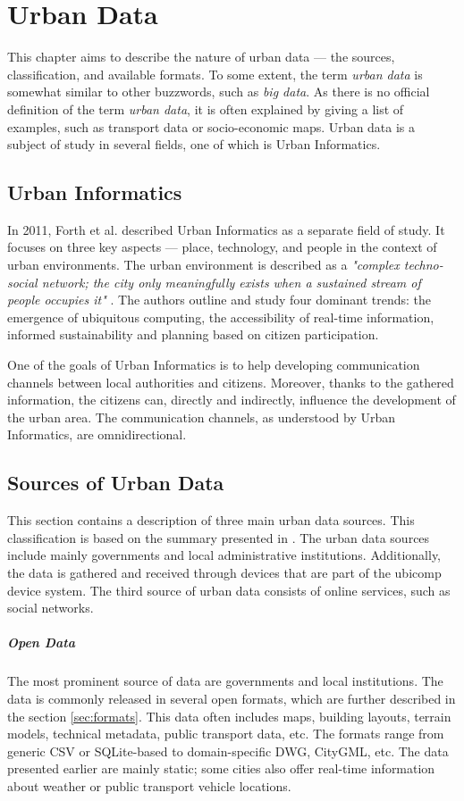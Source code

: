 \chapter{Urban Data}
This chapter aims to describe the nature of urban data --- the sources, classification, and available formats. To some extent, the term \textit{urban data} is somewhat similar to other buzzwords, such as \textit{big data}. As there is no official definition of the term \textit{urban data}, it is often explained by giving a list of examples, such as transport data or socio-economic maps. Urban data is a subject of study in several fields, one of which is Urban Informatics.

\section{Urban Informatics}
In 2011, Forth et al. \cite{foth2011urban} described Urban Informatics as a separate field of study. It focuses on three key aspects --- place, technology, and people in the context of urban environments. The urban environment is described as a \textit{"complex techno-social network; the city only meaningfully exists when a sustained stream of people occupies it"} \cite{foth2011urban}. The authors outline and study four dominant trends: the emergence of ubiquitous computing, the accessibility of real-time information, informed sustainability and planning based on citizen participation. 

One of the goals of Urban Informatics is to help developing communication channels between local authorities and citizens. Moreover, thanks to the gathered information, the citizens can, directly and indirectly, influence the development of the urban area. The communication channels, as understood by Urban Informatics, are omnidirectional. 

\section{Sources of Urban Data}
This section contains a description of three main urban data sources. This classification is based on the summary presented in \cite{robinson2012street}. The urban data sources include mainly governments and local administrative institutions. Additionally, the data is gathered and received through devices that are part of the ubicomp device system. The third source of urban data consists of online services, such as social networks. 

\paragraph{Open Data}
The most prominent source of data are governments and local institutions. The data is commonly released in several open formats, which are further described in the section \ref{sec:formats}. This data often includes maps, building layouts, terrain models, technical metadata, public transport data, etc. The formats range from generic CSV or SQLite-based to domain-specific DWG, CityGML, etc.   
The data presented earlier are mainly static; some cities also offer real-time information about weather or public transport vehicle locations. 

